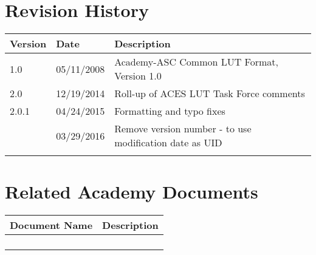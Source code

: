 \prelimsectionformat	%
\chapter{Revision History}

\begin{tabularx}{\linewidth}{|l|l|X|}
    \hline
    Version & Date & Description \\ \hline
    1.0     & 05/11/2008 & Academy-ASC Common LUT Format, Version 1.0      \\ \hline
    2.0     & 12/19/2014 & Roll-up of ACES LUT Task Force comments \\ \hline
    2.0.1   & 04/24/2015 & Formatting and typo fixes \\ \hline
            & 03/29/2016 & Remove version number - to use modification date as UID \\ \hline
            &      &             \\ \hline
\end{tabularx}

\vspace{0.25in} %
\chapter{Related Academy Documents} %
\begin{tabularx}{\linewidth}{|l|X|}
    \hline
    Document Name & Description  \\ \hline
    & \\ \hline
    & \\ \hline
    & \\ \hline
    & \\ \hline
\end{tabularx}